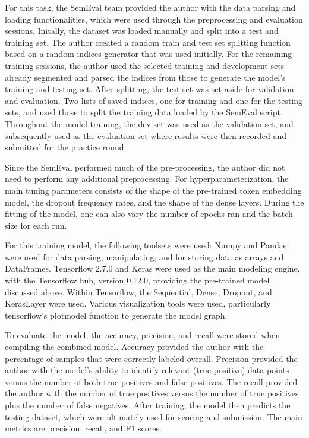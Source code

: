 \documentclass[11pt,a4paper]{article}
\begin{document}
For this task, the SemEval team provided the author with the data parsing and loading functionalities, which were used through the preprocessing and evaluation sessions. Initally, the dataset was loaded manually and split into a test and training set. The author created a random train and test set splitting function based on a random indices generator that was used initially. For the remaining training sessions, the author used the selected training and development sets already segmented and parsed the indices from those to generate the model's training and testing set. After splitting, the test set was set aside for validation and evaluation. Two lists of saved indices, one for training and one for the testing sets, and used those to split the training data loaded by the SemEval script. Throughout the model training, the dev set was used as the validation set, and subsequently used as the evaluation set where results were then recorded and submitted for the practice round. 

Since the SemEval performed much of the pre-processing, the author did not need to perform any additional preprocessing. For hyperparameterization, the main tuning parameters consists of the shape of the pre-trained token embedding model, the dropout frequency rates, and the shape of the dense layers. During the fitting of the model, one can also vary the number of epochs ran and the batch size for each run. 

For this training model, the following toolsets were used: Numpy and Pandas were used for data parsing, manipulating, and for storing data as arrays and DataFrames. Tensorflow 2.7.0 and Keras were used as the main modeling engine, with the Tensorflow hub, version 0.12.0, providing the pre-trained model discussed above. Within Tensorflow, the Sequential, Dense, Dropout, and KerasLayer were used. Various visualization tools were used, particularly tensorflow's plotmodel function to generate the model graph.

To evaluate the model, the accuracy, precision, and recall were stored when compiling the combined model. Accuracy provided the author with the percentage of samples that were correctly labeled overall. Precision provided the author with the model's ability to identify relevant (true positive) data points versus the number of both true positives and false positives. The recall provided the author with the number of true positives versus the number of true positives plus the number of false negatives. After training, the model then predicts the testing dataset, which were ultimately used for scoring and submission. The main metrics are precision, recall, and F1 scores.
\end{document}
